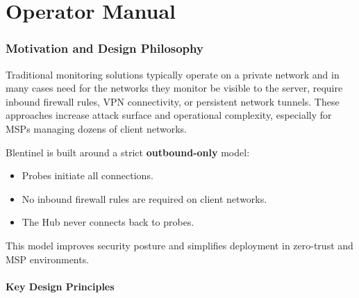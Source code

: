 \documentclass[12pt]{report}
\begin{document}
\part{Operator Manual}
\setcounter{section}{0}

\section{Motivation and Design Philosophy}

Traditional monitoring solutions typically operate on a private network and
in many cases need for the networks they monitor be visible to the server,
require inbound firewall rules, VPN connectivity, or persistent network tunnels.
These approaches increase attack surface and operational complexity, especially
for MSPs managing dozens of client networks.

Blentinel is built around a strict \textbf{outbound-only} model:

\begin{itemize}
    \item Probes initiate all connections.
    \item No inbound firewall rules are required on client networks.
    \item The Hub never connects back to probes.
\end{itemize}

This model improves security posture and simplifies deployment in zero-trust
and MSP environments.

\subsection{Key Design Principles}
\end{document}
